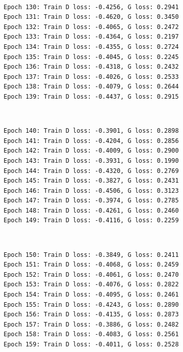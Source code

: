 \documentclass[11pt]{article}
\begin{document}
    \begin{center}
    \end{center}
    { \hspace*{\fill} \\}
    
    \begin{Verbatim}[commandchars=\\\{\}]
Epoch 130: Train D loss: -0.4256, G loss: 0.2941
Epoch 131: Train D loss: -0.4620, G loss: 0.3450
Epoch 132: Train D loss: -0.4065, G loss: 0.2472
Epoch 133: Train D loss: -0.4364, G loss: 0.2197
Epoch 134: Train D loss: -0.4355, G loss: 0.2724
Epoch 135: Train D loss: -0.4045, G loss: 0.2245
Epoch 136: Train D loss: -0.4318, G loss: 0.2432
Epoch 137: Train D loss: -0.4026, G loss: 0.2533
Epoch 138: Train D loss: -0.4079, G loss: 0.2644
Epoch 139: Train D loss: -0.4437, G loss: 0.2915

    \end{Verbatim}

    \begin{center}
    \end{center}
    { \hspace*{\fill} \\}
    
    \begin{Verbatim}[commandchars=\\\{\}]
Epoch 140: Train D loss: -0.3901, G loss: 0.2898
Epoch 141: Train D loss: -0.4204, G loss: 0.2856
Epoch 142: Train D loss: -0.4009, G loss: 0.2900
Epoch 143: Train D loss: -0.3931, G loss: 0.1990
Epoch 144: Train D loss: -0.4320, G loss: 0.2769
Epoch 145: Train D loss: -0.3827, G loss: 0.2431
Epoch 146: Train D loss: -0.4506, G loss: 0.3123
Epoch 147: Train D loss: -0.3974, G loss: 0.2785
Epoch 148: Train D loss: -0.4261, G loss: 0.2460
Epoch 149: Train D loss: -0.4116, G loss: 0.2259

    \end{Verbatim}

    \begin{center}
    \end{center}
    { \hspace*{\fill} \\}
    
    \begin{Verbatim}[commandchars=\\\{\}]
Epoch 150: Train D loss: -0.3849, G loss: 0.2411
Epoch 151: Train D loss: -0.4068, G loss: 0.2459
Epoch 152: Train D loss: -0.4061, G loss: 0.2470
Epoch 153: Train D loss: -0.4076, G loss: 0.2822
Epoch 154: Train D loss: -0.4095, G loss: 0.2461
Epoch 155: Train D loss: -0.4243, G loss: 0.2890
Epoch 156: Train D loss: -0.4135, G loss: 0.2873
Epoch 157: Train D loss: -0.3886, G loss: 0.2482
Epoch 158: Train D loss: -0.4083, G loss: 0.2561
Epoch 159: Train D loss: -0.4011, G loss: 0.2528

    \end{Verbatim}
\end{document}
